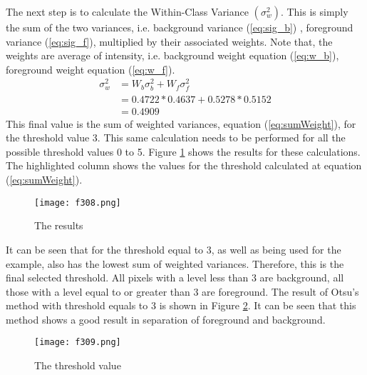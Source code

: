 The next step is to calculate the Within-Class Variance $(\sigma_{w}^2)$. This is simply the sum of the two variances, i.e. background variance (\ref{eq:sig_b}) , foreground variance (\ref{eq:sig_f}), multiplied by their associated weights. Note that, the weights are average of intensity, i.e. background weight equation (\ref{eq:w_b}), foreground weight equation (\ref{eq:w_f}).
\begin{align}
	\sigma_{w}^2 &= W_{b}\sigma_{b}^2 + W_{f}\sigma_{f}^2\\
	&=0.4722*0.4637+0.5278*0.5152\nonumber\\
	&=0.4909\label{eq:sumWeight}
\end{align}
This final value is the sum of weighted variances, equation (\ref{eq:sumWeight}), for the threshold value 3. This same calculation needs to be performed for all the possible threshold values 0 to 5. Figure \ref{fig:f308} shows the results for these calculations. The highlighted column shows the values for the threshold calculated at equation (\ref{eq:sumWeight}). 
\begin{figure}[t]
	\centering
	\texttt{[image: f308.png]}
	\caption{The results}
	\label{fig:f308}
\end{figure}
It can be seen that for the threshold equal to 3, as well as being used for the example, also has the lowest sum of weighted variances. Therefore, this is the final selected threshold. All pixels with a level less than 3 are background, all those with a level equal to or greater than 3 are foreground. The result of Otsu's method with threshold equals to 3 is shown in Figure \ref{fig:f309}. It can be seen that this method shows a good result in separation of foreground and background.
\begin{figure}[t]
	\centering
	\texttt{[image: f309.png]}
	\caption{The threshold value}
	\label{fig:f309}
\end{figure}

